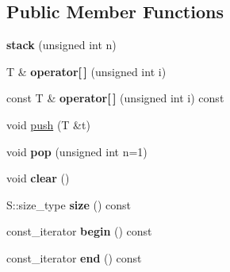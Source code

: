 \subsection*{Public Member Functions}
\begin{DoxyCompactItemize}
\item 
{\bfseries stack} (unsigned int n)\hypertarget{classEzAquarii_1_1stack_a1279c5b5db10a39046b0057a3146ad08}{}\label{classEzAquarii_1_1stack_a1279c5b5db10a39046b0057a3146ad08}

\item 
T \& {\bfseries operator\mbox{[}$\,$\mbox{]}} (unsigned int i)\hypertarget{classEzAquarii_1_1stack_a94fbf24df24c2b63580973a33c4774ab}{}\label{classEzAquarii_1_1stack_a94fbf24df24c2b63580973a33c4774ab}

\item 
const T \& {\bfseries operator\mbox{[}$\,$\mbox{]}} (unsigned int i) const \hypertarget{classEzAquarii_1_1stack_ae4f90ae16e8cf89a38f17727d0350790}{}\label{classEzAquarii_1_1stack_ae4f90ae16e8cf89a38f17727d0350790}

\item 
void \hyperlink{classEzAquarii_1_1stack_adf8eeda90efd761b757bc3fb10a322f2}{push} (T \&t)
\item 
void {\bfseries pop} (unsigned int n=1)\hypertarget{classEzAquarii_1_1stack_a0d83764724c1aeb0866bea4283ca949a}{}\label{classEzAquarii_1_1stack_a0d83764724c1aeb0866bea4283ca949a}

\item 
void {\bfseries clear} ()\hypertarget{classEzAquarii_1_1stack_a4c3850ed1979fe0d53df99b9f30e87a4}{}\label{classEzAquarii_1_1stack_a4c3850ed1979fe0d53df99b9f30e87a4}

\item 
S\+::size\+\_\+type {\bfseries size} () const \hypertarget{classEzAquarii_1_1stack_a1701313d320e2d33d48b1bab7190feac}{}\label{classEzAquarii_1_1stack_a1701313d320e2d33d48b1bab7190feac}

\item 
const\+\_\+iterator {\bfseries begin} () const \hypertarget{classEzAquarii_1_1stack_a74d1ce60cc8058f0aebbad274e72e377}{}\label{classEzAquarii_1_1stack_a74d1ce60cc8058f0aebbad274e72e377}

\item 
const\+\_\+iterator {\bfseries end} () const \hypertarget{classEzAquarii_1_1stack_a798ca75fed270bf8467eafbc4833e829}{}\label{classEzAquarii_1_1stack_a798ca75fed270bf8467eafbc4833e829}

\end{DoxyCompactItemize}


